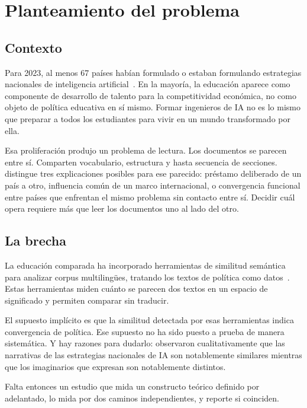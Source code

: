 \documentclass[12pt,letterpaper]{article}
\begin{document}
\section{Planteamiento del problema}

\subsection{Contexto}

Para 2023, al menos 67 países habían formulado o estaban formulando estrategias nacionales de inteligencia artificial~\citep{unesco2023genai}. En la mayoría, la educación aparece como componente de desarrollo de talento para la competitividad económica, no como objeto de política educativa en sí mismo. Formar ingenieros de IA no es lo mismo que preparar a todos los estudiantes para vivir en un mundo transformado por ella.

Esa proliferación produjo un problema de lectura. Los documentos se parecen entre sí. Comparten vocabulario, estructura y hasta secuencia de secciones. \citet{steinerkhamsi2014cross} distingue tres explicaciones posibles para ese parecido: préstamo deliberado de un país a otro, influencia común de un marco internacional, o convergencia funcional entre países que enfrentan el mismo problema sin contacto entre sí. Decidir cuál opera requiere más que leer los documentos uno al lado del otro.

\subsection{La brecha}

La educación comparada ha incorporado herramientas de similitud semántica para analizar corpus multilingües, tratando los textos de política como datos~\citep{grimmer2013text}. Estas herramientas miden cuánto se parecen dos textos en un espacio de significado y permiten comparar sin traducir.

El supuesto implícito es que la similitud detectada por esas herramientas indica convergencia de política. Ese supuesto no ha sido puesto a prueba de manera sistemática. Y hay razones para dudarlo: \citet{bareis2022talking} observaron cualitativamente que las narrativas de las estrategias nacionales de IA son notablemente similares mientras que los imaginarios que expresan son notablemente distintos.

Falta entonces un estudio que mida un constructo teórico definido por adelantado, lo mida por dos caminos independientes, y reporte si coinciden.
\end{document}
